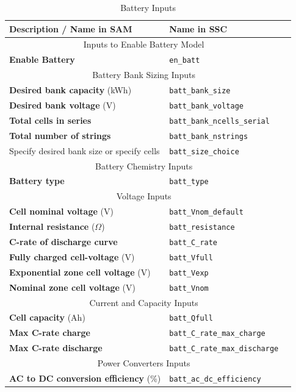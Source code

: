 \documentclass[12pt,letterpaper]{article}
\begin{document}
\begin{table}
\begin{center}
\caption{Battery Inputs}
\begin{tabular}{lll}
\midrule
Description / \textbf{Name in SAM} & Name in SSC \\
\midrule
\multicolumn{2}{c}{Inputs to Enable Battery Model}\\
\textbf{Enable Battery} & \texttt{en\_batt} \\
\midrule
\multicolumn{2}{c}{Battery Bank Sizing Inputs}\\
\textbf{Desired bank capacity} (kWh) & \texttt{batt\_bank\_size} \\
\textbf{Desired bank voltage} (V) & \texttt{batt\_bank\_voltage} \\
\textbf{Total cells in series} & \texttt{batt\_bank\_ncells\_serial} \\
\textbf{Total number of strings} & \texttt{batt\_bank\_nstrings} \\
Specify desired bank size or specify cells & \texttt{batt\_size\_choice} \\
\midrule
\multicolumn{2}{c}{Battery Chemistry Inputs}\\
\textbf{Battery type} & \texttt{batt\_type} \\
\midrule
\multicolumn{2}{c}{Voltage Inputs}\\
\textbf{Cell nominal voltage} (V) & \texttt{batt\_Vnom\_default} \\
\textbf{Internal resistance} ($\Omega$) & \texttt{batt\_resistance} \\
\textbf{C-rate of discharge curve} & \texttt{batt\_C\_rate} \\
\textbf{Fully charged cell-voltage} (V) & \texttt{batt\_Vfull} \\
\textbf{Exponential zone cell voltage} (V) & \texttt{batt\_Vexp} \\
\textbf{Nominal zone cell voltage} (V) & \texttt{batt\_Vnom} \\
\midrule
\multicolumn{2}{c}{Current and Capacity Inputs}\\
\textbf{Cell capacity} (Ah) & \texttt{batt\_Qfull} \\
\textbf{Max C-rate charge} & \texttt{batt\_C\_rate\_max\_charge} \\
\textbf{Max C-rate discharge} & \texttt{batt\_C\_rate\_max\_discharge} \\
\midrule
\multicolumn{2}{c}{Power Converters Inputs}\\
\textbf{AC to DC conversion efficiency} (\%) & \texttt{batt\_ac\_dc\_efficiency} \\

\end{tabular}
\end{center}
\end{table}
\end{document}
